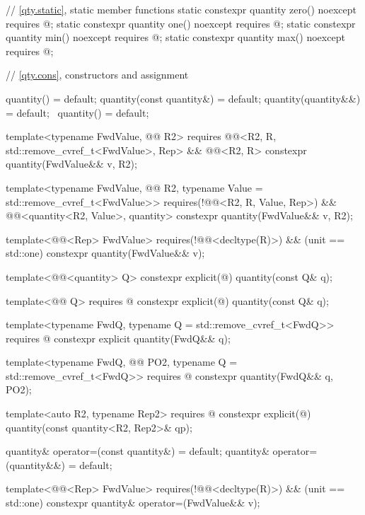\begin{codeblock}
{{  // \ref{qty.static}, static member functions
  static constexpr quantity zero() noexcept
    requires @\seebelownc@;
  static constexpr quantity one() noexcept
    requires @\seebelownc@;
  static constexpr quantity min() noexcept
    requires @\seebelownc@;
  static constexpr quantity max() noexcept
    requires @\seebelownc@;

  // \ref{qty.cons}, constructors and assignment

  quantity() = default;
  quantity(const quantity&) = default;
  quantity(quantity&&) = default;
  ~quantity() = default;

  template<typename FwdValue, @@ R2>
    requires @@<R2{}, R, std::remove_cvref_t<FwdValue>, Rep> &&
             @@<R2, R>
  constexpr quantity(FwdValue&& v, R2);

  template<typename FwdValue, @@ R2, typename Value = std::remove_cvref_t<FwdValue>>
    requires(!@@<R2{}, R, Value, Rep>) &&
            @@<quantity<R2{}, Value>, quantity>
  constexpr quantity(FwdValue&& v, R2);

  template<@@<Rep> FwdValue>
    requires(!@@<decltype(R)>) && (unit == std::one)
  constexpr quantity(FwdValue&& v);

  template<@@<quantity> Q>
  constexpr explicit(@\seebelownc@) quantity(const Q& q);

  template<@@ Q>
    requires @\seebelownc@
  constexpr explicit(@\seebelownc@) quantity(const Q& q);

  template<typename FwdQ, typename Q = std::remove_cvref_t<FwdQ>>
    requires @\seebelownc@
  constexpr explicit quantity(FwdQ&& q);

  template<typename FwdQ, @@ PO2, typename Q = std::remove_cvref_t<FwdQ>>
    requires @\seebelownc@
  constexpr quantity(FwdQ&& q, PO2);

  template<auto R2, typename Rep2>
    requires @\seebelownc@
  constexpr explicit(@\seebelownc@) quantity(const quantity<R2, Rep2>& qp);

  quantity& operator=(const quantity&) = default;
  quantity& operator=(quantity&&) = default;

  template<@@<Rep> FwdValue>
    requires(!@@<decltype(R)>) && (unit == std::one)
  constexpr quantity& operator=(FwdValue&& v);

}}
\end{codeblock}
